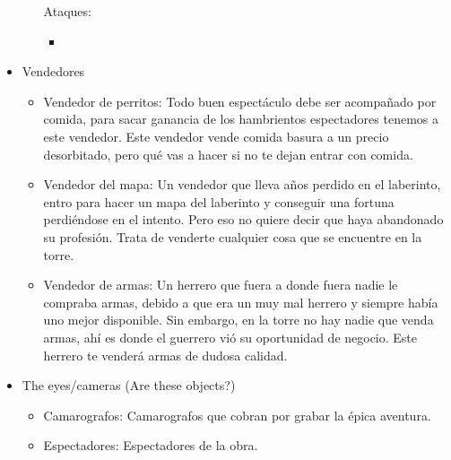 \begin{itemize}
\begin{itemize}
        Ataques:
        \begin{itemize}
            \item 
        \end{itemize}
    \end{itemize}
    \item Vendedores
    \begin{itemize}
        \item Vendedor de perritos: Todo buen espectáculo debe ser acompañado por comida, para sacar ganancia de los hambrientos espectadores tenemos a este vendedor. Este vendedor vende comida basura a un precio desorbitado, pero qué vas a hacer si no te dejan entrar con comida.
        \item Vendedor del mapa: Un vendedor que lleva años perdido en el laberinto, entro para hacer un mapa del laberinto y conseguir una fortuna perdiéndose en el intento. Pero eso no quiere decir que haya abandonado su profesión. Trata de venderte cualquier cosa que se encuentre en la torre.
        \item Vendedor de armas: Un herrero que fuera a donde fuera nadie le compraba armas, debido a que era un muy mal herrero y siempre había uno mejor disponible. Sin embargo, en la torre no hay nadie que venda armas, ahí es donde el guerrero vió su oportunidad de negocio. Este herrero te venderá armas de dudosa calidad.
    \end{itemize}
    \item The eyes/cameras (Are these objects?)
    \begin{itemize}
        \item Camarografos: Camarografos que cobran por grabar la épica aventura.
        \item Espectadores: Espectadores de la obra.
    \end{itemize}
\end{itemize}